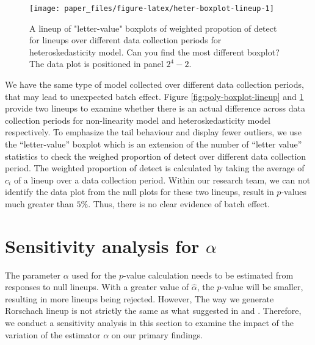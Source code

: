 \documentclass[]{interact}
\theoremstyle{plain}%
\theoremstyle{definition}
\theoremstyle{remark}
\begin{document}
\begin{figure}

{\centering \texttt{[image: paper\_files/figure-latex/heter-boxplot-lineup-1]} 

}

\caption{A lineup of "letter-value" boxplots of weighted propotion of detect for lineups over different data collection periods for heteroskedasticity model. Can you find the most different boxplot? The data plot is positioned in panel $2^4 - 2$.}\label{fig:heter-boxplot-lineup}
\end{figure}

We have the same type of model collected over different data collection
periods, that may lead to unexpected batch effect. Figure
\ref{fig:poly-boxplot-lineup} and \ref{fig:heter-boxplot-lineup} provide
two lineups to examine whether there is an actual difference across data
collection periods for non-linearity model and heteroskedasticity model
respectively. To emphasize the tail behaviour and display fewer
outliers, we use the ``letter-value'' boxplot \citep{hofmann2017value}
which is an extension of the number of ``letter value'' statistics to
check the weighed proportion of detect over different data collection
period. The weighted proportion of detect is calculated by taking the
average of \(c_i\) of a lineup over a data collection period. Within our
research team, we can not identify the data plot from the null plots for
these two lineups, result in \(p\)-values much greater than \(5\)\%.
Thus, there is no clear evidence of batch effect.

\hypertarget{sensitivity-analysis-for-alpha}{%
\section{\texorpdfstring{Sensitivity analysis for
\(\alpha\)}{Sensitivity analysis for \textbackslash alpha}}\label{sensitivity-analysis-for-alpha}}

The parameter \(\alpha\) used for the \(p\)-value calculation needs to
be estimated from responses to null lineups. With a greater value of
\(\hat{\alpha}\), the \(p\)-value will be smaller, resulting in more
lineups being rejected. However, The way we generate Rorschach lineup is
not strictly the same as what suggested in
\citet{vanderplas2021statistical} and \citet{buja_statistical_2009}.
Therefore, we conduct a sensitivity analysis in this section to examine
the impact of the variation of the estimator \(\alpha\) on our primary
findings.
\end{document}
